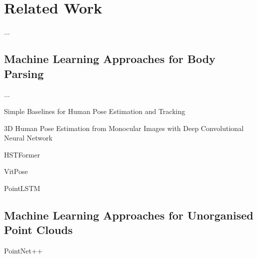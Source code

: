 \chapter{Related Work}
\label{chap:Related Work}
...
\section{Machine Learning Approaches for Body Parsing}

...

Simple Baselines for Human Pose Estimation and Tracking\cite{xiao2018simple}

3D Human Pose Estimation from Monocular Images with Deep Convolutional Neural Network\cite{inproceedings} 

HSTFormer\cite{qian2023hstformer} 

VitPose\cite{xu2022vitpose} 

PointLSTM\cite{9157795} 

\section{Machine Learning Approaches for Unorganised Point Clouds}

PointNet++\cite{Qi2017PointNetDH}


